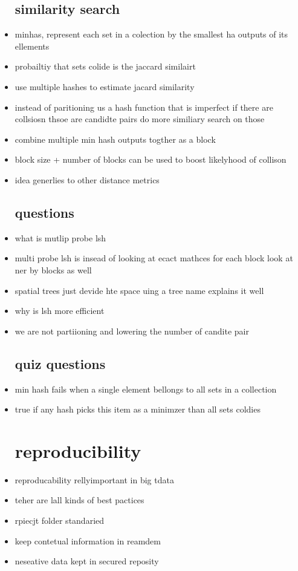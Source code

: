 \documentclass{article}
\begin{document}
\begin{itemize}
\subsection*{similarity search}
\item minhas, represent each set in a colection by the smallest ha outputs of its ellements 
\item probailtiy that sets colide is the jaccard similairt 
\item use multiple hashes to estimate jacard similarity
\item instead of paritioning us a hash function that is imperfect if there are collsiosn thsoe are candidte pairs do more similiary search on those 
\item combine multiple min hash outputs togther as a block 
\item block size + number of blocks can be used to boost likelyhood of collison 
\item idea generlies to other distance metrics 
\subsection*{questions}
\item what is mutlip probe lsh 
\item multi probe lsh is insead of looking at ecact mathces for each block look at ner by blocks as well 
\item spatial trees just devide hte space uing a tree name explains it well
\item why is lsh more efficient 
\item we are not partiioning and lowering the number of candite pair 
\subsection*{quiz questions}
\item min hash fails when a single element bellongs to all sets in a collection 
\item true if any hash picks this item as a minimzer than all sets coldies 
\section*{reproducibility}
\item reproducability rellyimportant in big tdata 
\item teher are lall kinds of best pactices 
\item rpiecjt folder standaried 
\item keep contetual information in reamdem
\item neseative data kept in secured reposity

\end{itemize}
\end{document}

